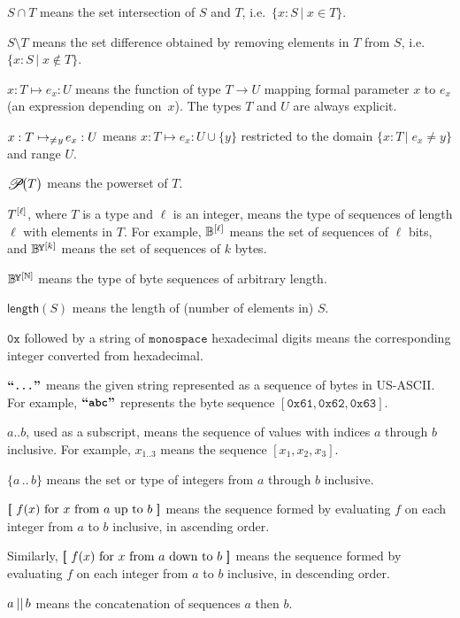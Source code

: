 \documentclass{article}
\newcommand{\typecolon}{:}
\newcommand{\bit}{\mathbb{B}}
\newcommand{\overlap}[2]{\rlap{#2}\hspace{#1}{#2}}
\newcommand{\byte}{\mathbb{B}\kern -0.1em\raisebox{0.48ex}{\overlap{0.0001em}{\scalebox{0.7}{$\mathbb{Y}$}}}}
\newcommand{\Nat}{\mathbb{N}}
\newcommand{\typeexp}[2]{{#1}\vphantom{)}^{[{#2}]}}
\newcommand{\bitseq}[1]{\typeexp{\bit}{#1}}
\newcommand{\byteseq}[1]{\typeexp{\byte}{#1}}
\newcommand{\byteseqs}{\byteseq{\Nat}}
\newcommand{\bconcat}{\mathop{\kern 0.05em||}}
\newcommand{\listcomp}[1]{\overlap{0.06em}{\ensuremath{[}}~{#1}~\overlap{0.06em}{\ensuremath{]}}}
\newcommand{\fun}[2]{{#1} \mapsto {#2}}
\newcommand{\exclusivefun}[3]{{#1} \mapsto_{\neq\kern 0.05em{#3}\!} {#2}}
\newcommand{\for}{\text{ for }}
\newcommand{\from}{\text{ from }}
\newcommand{\upto}{\text{ up to }}
\newcommand{\downto}{\text{ down to }}
\newcommand{\length}{\mathsf{length}}
\newcommand{\hexint}[1]{\mathtt{0x{#1}}}
\newcommand{\ascii}[1]{\textbf{``\texttt{#1}''}}
\newcommand{\setof}[1]{\{{#1}\}}
\newcommand{\powerset}[1]{\raisebox{-0.28ex}{\scalebox{1.25}{$\mathscr{P}$}}\kern -0.2em\big(\strut{#1}\big)}
\newcommand{\barerange}[2]{{{#1}\,..\,{#2}}}
\newcommand{\range}[2]{\setof{\barerange{#1}{#2}}}
\newcommand{\union}{\cup}
\newcommand{\intersection}{\cap}
\newcommand{\suchthat}{\,\vert\;}
\begin{document}
$S \intersection T$ means the set intersection of $S$ and $T$,
i.e.\ $\setof{x \typecolon S \suchthat x \in T}$.

$S \setminus T$ means the set difference obtained by removing elements
in $T$ from $S$, i.e. $\setof{x \typecolon S \suchthat x \notin T}$.

$\fun{x \typecolon T}{e_x \typecolon U}$ means the function of type $T \rightarrow U$
mapping formal parameter $x$ to $e_x$ (an expression depending on~$x$).
The types $T$ and $U$ are always explicit.

$\exclusivefun{x \typecolon T}{e_x \typecolon U}{y}$ means
$\fun{x \typecolon T}{e_x \typecolon U \union \setof{y}}$ restricted to the domain
$\setof{x \typecolon T \suchthat e_x \neq y}$ and range $U$.

$\powerset{T}$ means the powerset of $T$.

$\typeexp{T}{\ell}$, where $T$ is a type and $\ell$ is an integer,
means the type of sequences of length $\ell$ with elements in $T$. For example,
$\bitseq{\ell}$ means the set of sequences of $\ell$ bits, and
$\byteseq{k}$ means the set of sequences of $k$ bytes.

$\byteseqs$ means the type of byte sequences of arbitrary length.

$\length(S)$ means the length of (number of elements in) $S$.

$\hexint{}$ followed by a string of $\mathtt{monospace}$ hexadecimal
digits means the corresponding integer converted from hexadecimal.

$\ascii{...}$ means the given string represented as a
sequence of bytes in US-ASCII. For example, $\ascii{abc}$ represents the
byte sequence $[ \hexint{61}, \hexint{62}, \hexint{63} ]$.

$a..b$, used as a subscript, means the sequence of values
with indices $a$ through $b$ inclusive. For example,
$x_{1..3}$ means the sequence $[ x_1, x_2, x_3 ]$.

$\range{a}{b}$ means the set or type of integers from $a$ through
$b$ inclusive.

$\listcomp{f(x) \for x \from a \upto b}$ means the sequence
formed by evaluating $f$ on each integer from $a$ to $b$ inclusive, in
ascending order.

Similarly, $\listcomp{f(x) \for x \from a \downto b}$ means
the sequence formed by evaluating $f$ on each integer from $a$ to $b$
inclusive, in descending order.

$a \bconcat b$ means the concatenation of sequences $a$ then $b$.
\end{document}
